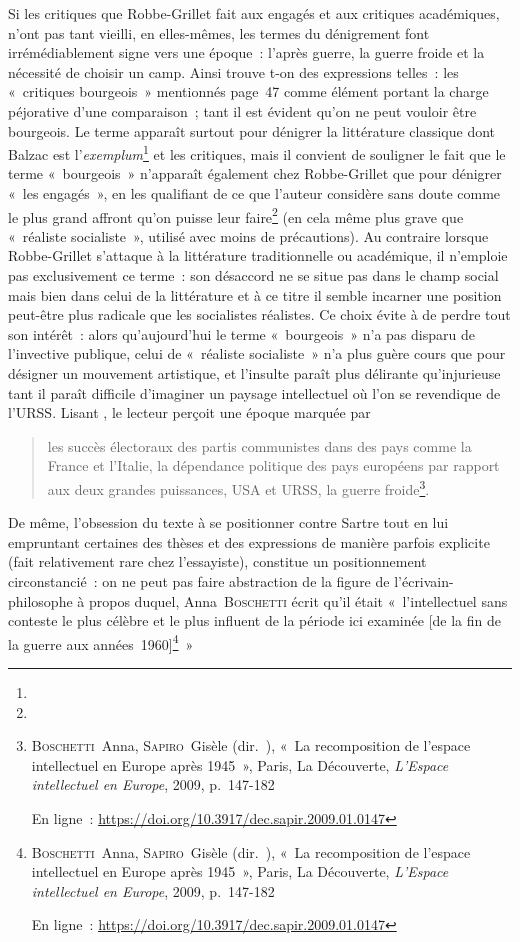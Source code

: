 Si les critiques que Robbe-Grillet fait aux engagés et aux critiques académiques, n'ont pas tant vieilli, en elles-mêmes, les termes du dénigrement font irrémédiablement signe vers une époque~: l'après guerre, la guerre froide et la nécessité de choisir un camp. Ainsi trouve t-on des expressions telles~: les «~critiques bourgeois~» mentionnés page~47 comme élément portant la charge péjorative d'une comparaison~; tant il est évident qu'on ne peut vouloir être bourgeois. Le terme apparaît surtout pour dénigrer la littérature classique dont Balzac est l'\textit{exemplum}\footnote{} et les critiques, mais il convient de souligner le fait que le terme «~bourgeois~» n'apparaît également chez Robbe-Grillet que pour dénigrer «~les engagés~», en les qualifiant de ce que l'auteur considère sans doute comme le plus grand affront qu'on puisse leur faire\footnote{} (en cela même plus grave que «~réaliste socialiste~», utilisé avec moins de précautions). Au contraire lorsque Robbe-Grillet s'attaque à la littérature traditionnelle ou académique, il n'emploie pas exclusivement ce terme~: son désaccord ne se situe pas dans le champ social mais bien dans celui de la littérature et à ce titre il semble incarner une position peut-être plus radicale que les socialistes réalistes. Ce choix évite à \punr{} de perdre tout son intérêt~: alors qu'aujourd'hui le terme «~bourgeois~» n'a pas disparu de l'invective publique, celui de «~réaliste socialiste~» n'a plus guère cours que pour désigner un mouvement artistique, et l'insulte paraît plus délirante qu'injurieuse tant il paraît difficile d'imaginer un paysage intellectuel où l'on se revendique de l'URSS. Lisant \punr, le lecteur perçoit une époque marquée par
\begin{quote}
    les succès électoraux des partis communistes dans des pays comme la France et l’Italie, la dépendance politique des pays européens par rapport aux deux grandes puissances, USA et URSS, la guerre froide\footnote{\textsc{Boschetti}~Anna, \textsc{Sapiro}~Gisèle (dir.~), «~La recomposition de l'espace intellectuel en Europe après 1945~», Paris, La Découverte, \textit{L'Espace intellectuel en Europe}, 2009, p.~147-182

En ligne~: \href{https://doi.org/10.3917/dec.sapir.2009.01.0147}{https://doi.org/10.3917/dec.sapir.2009.01.0147}}.
\end{quote}


De même, l'obsession du texte à se positionner contre Sartre tout en lui empruntant certaines des thèses et des expressions de manière parfois explicite (fait relativement rare chez l'essayiste), constitue un positionnement circonstancié~: on ne peut pas faire abstraction de la figure de l'écrivain-philosophe à propos duquel, Anna~\textsc{Boschetti} écrit qu'il était «~l’intellectuel sans conteste le plus célèbre et le plus influent de la période ici examinée [de la fin de la guerre aux années~1960]\footnote{\textsc{Boschetti}~Anna, \textsc{Sapiro}~Gisèle (dir.~), «~La recomposition de l'espace intellectuel en Europe après 1945~», Paris, La Découverte, \textit{L'Espace intellectuel en Europe}, 2009, p.~147-182

En ligne~: \href{https://doi.org/10.3917/dec.sapir.2009.01.0147}{https://doi.org/10.3917/dec.sapir.2009.01.0147}}~»

